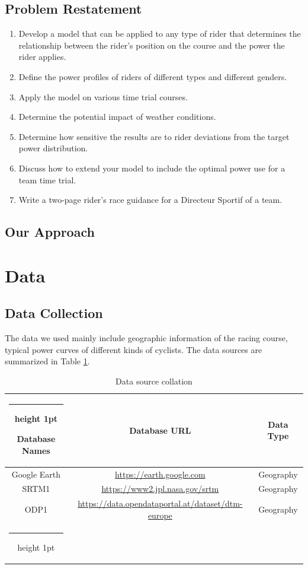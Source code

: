 \documentclass{mcmthesis}
\makeatletter
\newcommand{\thickhline}{%
    \noalign {\ifnum 0=`}\fi \hrule height 1pt
    \futurelet \reserved@a \@xhline
}
\makeatother
\begin{document}
  \subsection{Problem Restatement}
  \begin{enumerate}
    \item Develop a model that can be applied to any type of rider that determines the relationship between the rider’s position on the course and the power the rider applies.
    \item Define the power profiles of riders of different types and different genders.
    \item Apply the model on various time trial courses.
    \item Determine the potential impact of weather conditions.
    \item Determine how sensitive the results are to rider deviations from the target power distribution.
    \item Discuss how to extend your model to include the optimal power use for a team time trial.
    \item Write a two-page rider’s race guidance for a Directeur Sportif of a team.
  \end{enumerate}
  
  \subsection{Our Approach}

  \section{Data}
  \subsection{Data Collection}
  The data we used mainly include geographic information of the racing course, typical power curves of different kinds of cyclists.
  The data sources are summarized in Table \ref{tab:data_source}.
  \begin{table}[H]
    \centering
    \caption{Data source collation}
    \label{tab:data_source}
    \begin{tabular}{ccc}
    \thickhline
    Database Names & Database URL & Data Type \\\hline
    Google Earth & \href{https://earth.google.com}{https://earth.google.com} & Geography \\
    SRTM1 & \href{https://www2.jpl.nasa.gov/srtm}{https://www2.jpl.nasa.gov/srtm} & Geography \\
    ODP1 & \href{https://data.opendataportal.at/dataset/dtm-europe}{https://data.opendataportal.at/dataset/dtm-europe} & Geography \\
    \thickhline
    \end{tabular}
  \end{table}
\end{document}
